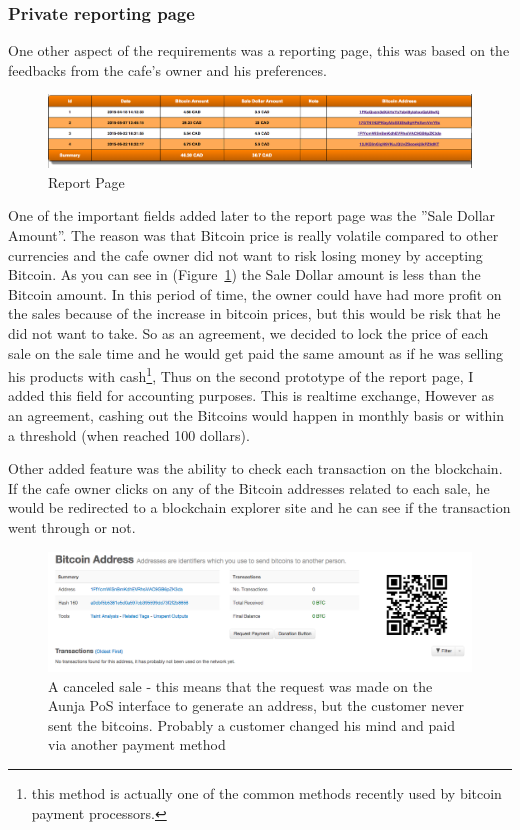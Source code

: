 \subsubsection{Private reporting page}
One other aspect of the requirements was a reporting page, this was based on the feedbacks from the cafe's owner and his preferences.

\begin{figure}[htb!p]
\centering
\includegraphics[width=\linewidth]{fig/report_page.png}
  \caption{Report Page}
\label{fig:report_page}
\end{figure}

One of the important fields added later to the report page was the ''Sale Dollar Amount''. The reason was that Bitcoin price is really volatile compared to other currencies and the cafe owner did not want to risk losing money by accepting Bitcoin. As you can see in (Figure~\ref{fig:report_page}) the Sale Dollar amount is less than the Bitcoin amount. In this period of time, the owner could have had more profit on the sales because of the increase in bitcoin prices, but this would be risk that he did not want to take. So as an agreement, we decided to lock the price of each sale on the sale time and he would get paid the same amount as if he was selling his products with cash\footnote{this method is actually one of the common methods recently used by bitcoin payment processors.}, Thus on the second prototype of the report page, I added this field for accounting purposes. This is realtime exchange, However as an agreement, cashing out the Bitcoins would happen in monthly basis or within a threshold (\eg when reached 100 dollars).

Other added feature was the ability to check each transaction on the blockchain. If the cafe owner clicks on any of the Bitcoin addresses related to each sale, he would be redirected to a blockchain explorer site and he can see if the transaction went through or not.

\begin{figure}[htb!p]
\centering
\includegraphics[width=\linewidth]{fig/canceled_sale.png}
  \caption{A canceled sale - this means that the request was made on the Aunja PoS interface to generate an address, but the customer never sent the bitcoins. Probably a customer changed his mind and paid via another payment method}
\label{fig:canceled_sale}
\end{figure}


